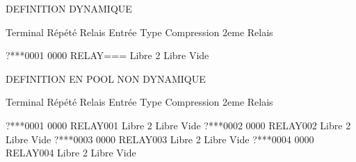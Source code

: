 \documentclass[letterpaper,10pt,english]{sphinxmanual}
\begin{document}
\begin{sphinxVerbatim}[commandchars=\\\{\}]
 

              

                       
                       
                       
                       
\end{sphinxVerbatim}

\begin{sphinxVerbatim}[commandchars=\\\{\}]
 

              

                       
\end{sphinxVerbatim}

\begin{sphinxVerbatim}[commandchars=\\\{\}]
DEFINITION DYNAMIQUE

Terminal Répété  Relais    Entrée    Type Compression 2eme Relais

?***0001 0000    RELAY===  Libre     2    Libre       Vide
\end{sphinxVerbatim}

\begin{sphinxVerbatim}[commandchars=\\\{\}]
DEFINITION EN POOL NON DYNAMIQUE

Terminal Répété Relais Entrée Type Compression 2eme Relais

?***0001 0000 RELAY001 Libre 2 Libre Vide
?***0002 0000 RELAY002 Libre 2 Libre Vide
?***0003 0000 RELAY003 Libre 2 Libre Vide
?***0004 0000 RELAY004 Libre 2 Libre Vide
\end{sphinxVerbatim}
\end{document}
